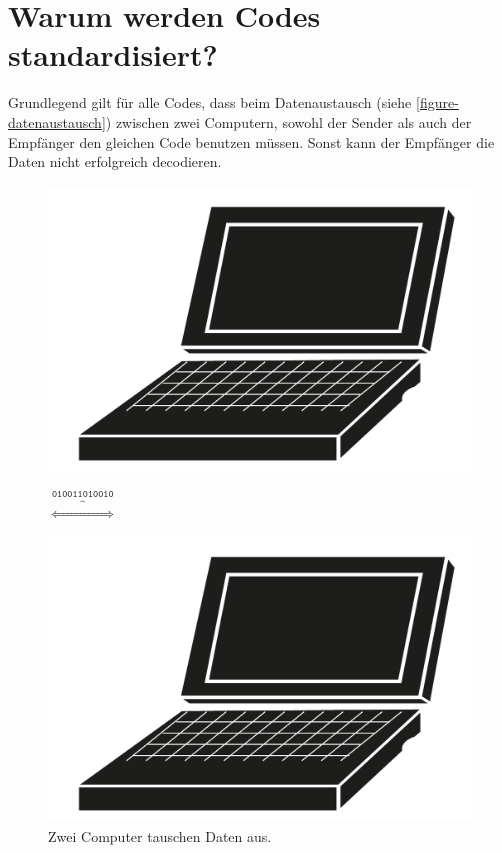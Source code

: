 \section{Warum werden Codes standardisiert?}

Grundlegend gilt für alle Codes, dass beim Datenaustausch (siehe \autoref{figure-datenaustausch}) zwischen zwei Computern, sowohl der Sender als auch der Empfänger den gleichen Code benutzen müssen. Sonst kann der Empfänger die Daten nicht erfolgreich decodieren.

\begin{figure}[htb]
\centering
\begin{minipage}{0.15\textwidth}
\centering
\includegraphics[scale=0.1]{notebook}
\end{minipage}
$\overbrace{\Longleftrightarrow}^{\texttt{010011010010}}$
\begin{minipage}{0.15\textwidth}
\centering
\includegraphics[scale=0.1]{notebook}
\end{minipage}
\caption{Zwei Computer tauschen Daten aus.}
\label{figure-datenaustausch}
\end{figure}

